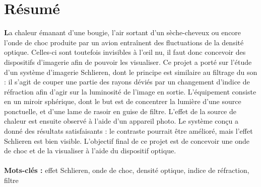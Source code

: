 \section*{Résumé}
\small{\textbf{L}a chaleur émanant d’une bougie, l’air sortant d'un sèche-cheveux ou encore l’onde de choc produite par un avion entraînent des fluctuations de la densité optique. Celles-ci sont toutefois invisibles à l’œil nu, il faut donc concevoir des dispositifs d’imagerie afin de pouvoir les visualiser. Ce projet a porté sur l’étude d’un système d’imagerie Schlieren, dont le principe est similaire au filtrage du son : il s’agit de couper une partie des rayons déviés par un changement d’indice de réfraction afin d’agir sur la luminosité de l’image en sortie. L’équipement consiste en un miroir sphérique, dont le but est de concentrer la lumière d’une source ponctuelle, et d’une lame de rasoir en guise de filtre. L'effet de la source de chaleur est ensuite observé à l'aide d'un appareil photo. Le système conçu a donné des résultats satisfaisants : le contraste pourrait être amélioré, mais l'effet Schlieren est bien visible. L’objectif final de ce projet est de concevoir une onde de choc et de la visualiser à l'aide du dispositif optique.}
\\
\\
\small{\textbf{Mots-clés :} effet Schlieren, onde de choc, densité optique, indice de réfraction, filtre} 
